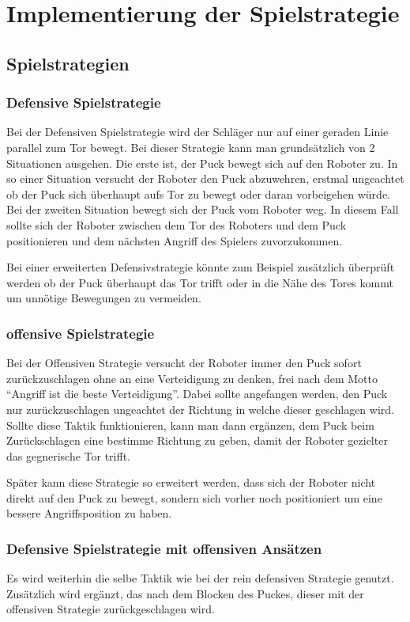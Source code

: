
\chapter{Implementierung der Spielstrategie}

\section{Spielstrategien}
\subsection{Defensive Spielstrategie}
Bei der Defensiven Spielstrategie wird der Schläger nur auf einer geraden Linie parallel zum Tor bewegt. Bei dieser Strategie kann man grundsätzlich von 2 Situationen ausgehen. Die erste ist, der Puck bewegt sich auf den Roboter zu. In so einer Situation versucht der Roboter den Puck abzuwehren, erstmal ungeachtet ob der Puck sich überhaupt aufs Tor zu bewegt oder daran vorbeigehen würde. Bei der zweiten Situation bewegt sich der Puck vom Roboter weg. In diesem Fall sollte sich der Roboter zwischen dem Tor des Roboters und dem Puck positionieren und dem nächsten Angriff des Spielers zuvorzukommen.

Bei einer erweiterten Defensivstrategie könnte zum Beispiel zusätzlich überprüft werden ob der Puck überhaupt das Tor trifft oder in die Nähe des Tores kommt um unnötige Bewegungen zu vermeiden.

\subsection{offensive Spielstrategie}
Bei der Offensiven Strategie versucht der Roboter immer den Puck sofort zurückzuschlagen ohne an eine Verteidigung zu denken, frei nach dem Motto \enquote{Angriff ist die beste Verteidigung}. Dabei sollte angefangen werden, den Puck nur zurückzuschlagen ungeachtet der Richtung in welche dieser geschlagen wird. Sollte diese Taktik funktionieren, kann man dann ergänzen, dem Puck beim Zurückschlagen eine bestimme Richtung zu geben, damit der Roboter gezielter das gegnerische Tor trifft.

Später kann diese Strategie so erweitert werden, dass sich der Roboter nicht direkt auf den Puck zu bewegt, sondern sich vorher noch positioniert um eine bessere Angriffsposition zu haben.

\subsection{Defensive Spielstrategie mit offensiven Ansätzen}
Es wird weiterhin die selbe Taktik wie bei der rein defensiven Strategie genutzt. Zusätzlich wird ergänzt, das nach dem Blocken des Puckes, dieser mit der offensiven Strategie zurückgeschlagen wird.

